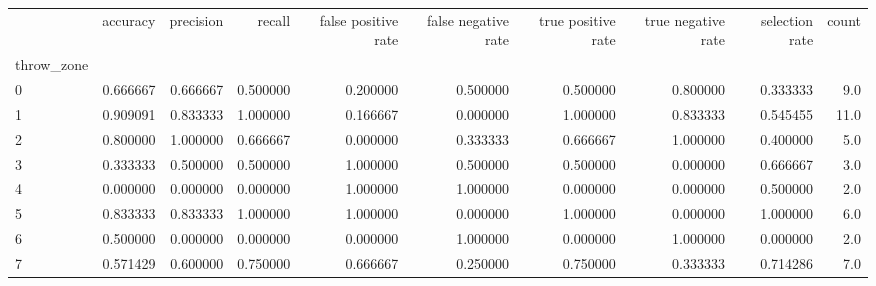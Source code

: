 \begin{tabular}{lrrrrrrrrr}
\toprule
{} &  accuracy &  precision &    recall &  false positive rate &  false negative rate &  true positive rate &  true negative rate &  selection rate &  count \\
throw\_zone &           &            &           &                      &                      &                     &                     &                 &        \\
\midrule
0          &  0.666667 &   0.666667 &  0.500000 &             0.200000 &             0.500000 &            0.500000 &            0.800000 &        0.333333 &    9.0 \\
1          &  0.909091 &   0.833333 &  1.000000 &             0.166667 &             0.000000 &            1.000000 &            0.833333 &        0.545455 &   11.0 \\
2          &  0.800000 &   1.000000 &  0.666667 &             0.000000 &             0.333333 &            0.666667 &            1.000000 &        0.400000 &    5.0 \\
3          &  0.333333 &   0.500000 &  0.500000 &             1.000000 &             0.500000 &            0.500000 &            0.000000 &        0.666667 &    3.0 \\
4          &  0.000000 &   0.000000 &  0.000000 &             1.000000 &             1.000000 &            0.000000 &            0.000000 &        0.500000 &    2.0 \\
5          &  0.833333 &   0.833333 &  1.000000 &             1.000000 &             0.000000 &            1.000000 &            0.000000 &        1.000000 &    6.0 \\
6          &  0.500000 &   0.000000 &  0.000000 &             0.000000 &             1.000000 &            0.000000 &            1.000000 &        0.000000 &    2.0 \\
7          &  0.571429 &   0.600000 &  0.750000 &             0.666667 &             0.250000 &            0.750000 &            0.333333 &        0.714286 &    7.0 \\
\bottomrule
\end{tabular}

